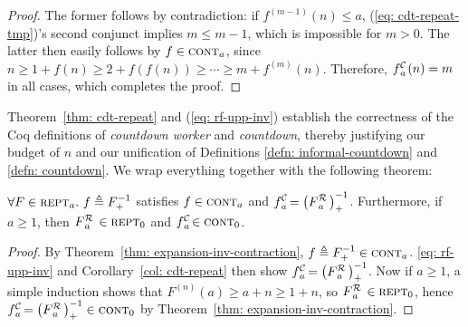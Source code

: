 \begin{proof}
	The former follows by contradiction: if $f^{(m-1)}(n) \le a$, (\ref{eq: cdt-repeat-tmp})'s second conjunct implies $m\le m-1$, which is impossible for $m > 0$. The latter then easily follows by $f\in \text{\scshape{cont}}_{a}$, since
	$n \ge 1 + f(n) \ge 2 + f(f(n)) \ge \cdots \ge m + f^{(m)}(n)$.
	\linebreak Therefore, $\cdt{f}{a}(n) = m$ in all cases, which completes the proof.
\end{proof}
Theorem~\ref{thm: cdt-repeat} and (\ref{eq: rf-upp-inv}) establish the correctness of the Coq definitions of \emph{countdown worker} and \emph{countdown}, thereby justifying our budget of $n$ and our unification of 
Definitions \ref{defn: informal-countdown} and \ref{defn: countdown}. We wrap everything together with the following theorem:
\begin{thm} \label{thm: cdt-inv-rf}
	$\forall F\in \text{\scshape{rept}}_a.~f\triangleq F^{-1}_+$ satisfies $f \in \text{\scshape{cont}}_{a}$ and $\displaystyle \cdt{f}{a} \ = \left(\rf{F}{a}\ \right)^{-1}_+$. Furthermore, if $a\ge 1$, then $\rf{F}{a}\ \in \repeatable_0$ and $\cdt{f}{a}\ \in \contract_0$.
\end{thm}
\begin{proof}
	By Theorem~\ref{thm: expansion-inv-contraction}, $f\triangleq F^{-1}_+ \in \text{\scshape{cont}}_a$. 
	\eqref{eq: rf-upp-inv} and Corollary~\ref{col: cdt-repeat}
	then show $\cdt{f}{a}\ = \left(\rf{F}{a}\ \right)^{-1}_+$.
	Now if $a\ge 1$, a simple induction shows that $F^{(n)}(a)\ge a + n\ge 1 + n$, so $\rf{F}{a}\ \in \repeatable_0$, hence $\cdt{f}{a} \ = \left(\rf{F}{a}\ \right)^{-1}_+ \in \contract_0$ by Theorem~\ref{thm: expansion-inv-contraction}.
\end{proof}

